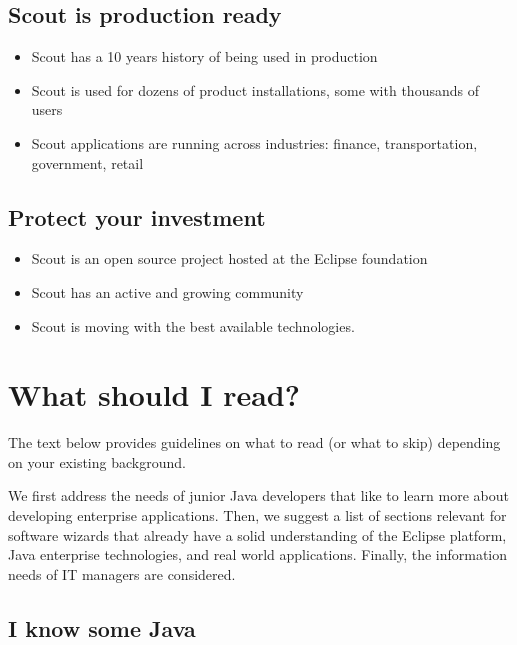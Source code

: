 \documentclass[a4paper,10pt,twoside]{book}
\begin{document}
\subsection{Scout is production ready}
\begin{itemize}
  \item Scout has a 10 years history of being used in production
  \item Scout is used for dozens of product installations, some with thousands of users
  \item Scout applications are running across industries: finance, transportation, government, retail
\end{itemize}

\subsection{Protect your investment}
\begin{itemize}
  \item Scout is an open source project hosted at the Eclipse foundation
  \item Scout has an active and growing community
  \item Scout is moving with the best available technologies.
\end{itemize}

\section{What should I read?} 

The text below provides guidelines on what to read (or what to skip) depending on your existing background.

We first address the needs of junior Java developers that like to learn more about developing enterprise applications.
Then, we suggest a list of sections relevant for software wizards that already have a solid understanding of the Eclipse platform, Java enterprise technologies, and real world applications.
Finally, the information needs of IT managers are considered.

\subsection{I know some Java}
\end{document}
